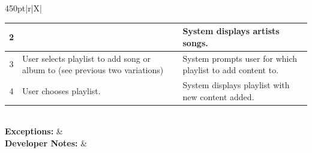 \documentclass[12pt]{article}
\begin{document}
\begin{center}
\begin{tabularx}{450pt}{|r|X|}
\begin{enumerate}[label=(\alph*)]
{\begin{tabularx}{296pt}{|c|X|X|}
						2 & & System displays artists songs.\\\hline
						3 & User selects playlist to add song or album to (see previous two variations) & System prompts user for which playlist to add content to. \\\hline
						4 & User chooses playlist. & System displays playlist with new content added. \\\hline
				\end{tabularx}} 
			\end{enumerate}\\\hline
			\textbf{Exceptions:} &  \\\hline
			\textbf{Developer Notes:} & \\\hline
		\end{tabularx}
	\end{center}
	
\end{document}
